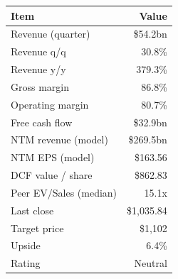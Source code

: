 \begin{tabular}{@{}lr@{}}
\toprule
Item & Value \\
\midrule
Revenue (quarter) & \$54.2bn \\
Revenue q/q & 30.8\% \\
Revenue y/y & 379.3\% \\
Gross margin & 86.8\% \\
Operating margin & 80.7\% \\
Free cash flow & \$32.9bn \\
\midrule
NTM revenue (model) & \$269.5bn \\
NTM EPS (model) & \$163.56 \\
DCF value / share & \$862.83 \\
Peer EV/Sales (median) & 15.1x \\
Last close & \$1,035.84 \\
Target price & \$1,102 \\
Upside & 6.4\% \\
Rating & Neutral \\
\bottomrule
\end{tabular}
